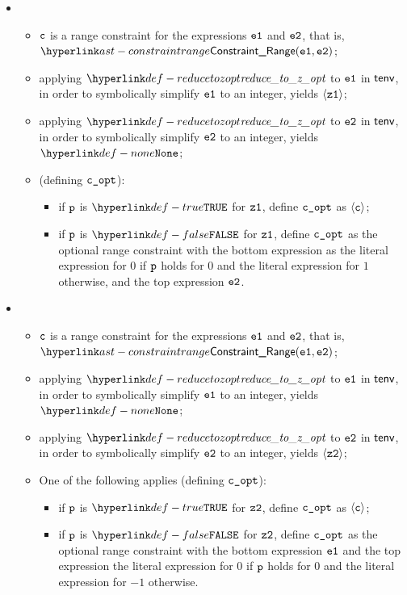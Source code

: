 \begin{itemize}
  \item {}
  \begin{itemize}
    \item $\texttt{c}$ is a range constraint for the expressions $\texttt{e1}$ and $\texttt{e2}$, that is, \\
          $\ConstraintRange(\veone, \vetwo)$;
    \item applying $\reducetozopt$ to $\texttt{e1}$ in $\textsf{tenv}$, in order to symbolically simplify $\texttt{e1}$ to an integer,
          yields $\langle\texttt{z1}\rangle$;
    \item applying $\reducetozopt$ to $\texttt{e2}$ in $\textsf{tenv}$, in order to symbolically simplify $\texttt{e2}$ to an integer,
          yields $\None$;
    \item \OneApplies{} (defining $\texttt{c\_opt}$):
    \begin{itemize}
      \item if $\texttt{p}$ is $\True$ for $\texttt{z1}$, define $\texttt{c\_opt}$ as $\langle\texttt{c}\rangle$;
      \item if $\texttt{p}$ is $\False$ for $\texttt{z1}$, define $\texttt{c\_opt}$ as the optional range constraint with the bottom expression
            as the literal expression for $0$ if $\texttt{p}$ holds for $0$ and the literal expression for $1$ otherwise,
            and the top expression $\texttt{e2}$.
    \end{itemize}
  \end{itemize}

  \item {}
  \begin{itemize}
    \item $\texttt{c}$ is a range constraint for the expressions $\texttt{e1}$ and $\texttt{e2}$, that is, \\
          $\ConstraintRange(\veone, \vetwo)$;
    \item applying $\reducetozopt$ to $\texttt{e1}$ in $\textsf{tenv}$, in order to symbolically simplify $\texttt{e1}$ to an integer,
          yields $\None$;
    \item applying $\reducetozopt$ to $\texttt{e2}$ in $\textsf{tenv}$, in order to symbolically simplify $\texttt{e2}$ to an integer,
          yields $\langle\texttt{z2}\rangle$;
    \item One of the following applies (defining $\texttt{c\_opt}$):
    \begin{itemize}
      \item if $\texttt{p}$ is $\True$ for $\texttt{z2}$, define $\texttt{c\_opt}$ as $\langle\texttt{c}\rangle$;
      \item if $\texttt{p}$ is $\False$ for $\texttt{z2}$, define $\texttt{c\_opt}$ as the optional range constraint with the bottom expression
            $\texttt{e1}$ and the top expression the literal expression for $0$ if $\texttt{p}$ holds for $0$ and the literal expression for $-1$ otherwise.
    \end{itemize}
  \end{itemize}


\end{itemize}
